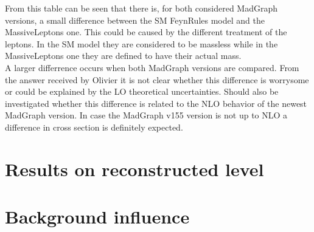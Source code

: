 From this table can be seen that there is, for both considered MadGraph versions, a small difference between the SM FeynRules model and the MassiveLeptons one. This could be caused by the different treatment of the leptons. In the SM model they are considered to be massless while in the MassiveLeptons one they are defined to have their actual mass.\\
A larger differrence occurs when both MadGraph versions are compared. From the answer received by Olivier it is not clear whether this difference is worrysome or could be explained by the LO theoretical uncertainties. Should also be investigated whether this difference is related to the NLO behavior of the newest MadGraph version. In case the MadGraph v155 version is not up to NLO a difference in cross section is definitely expected.


\section{Results on reconstructed level}

\section{Background influence}
